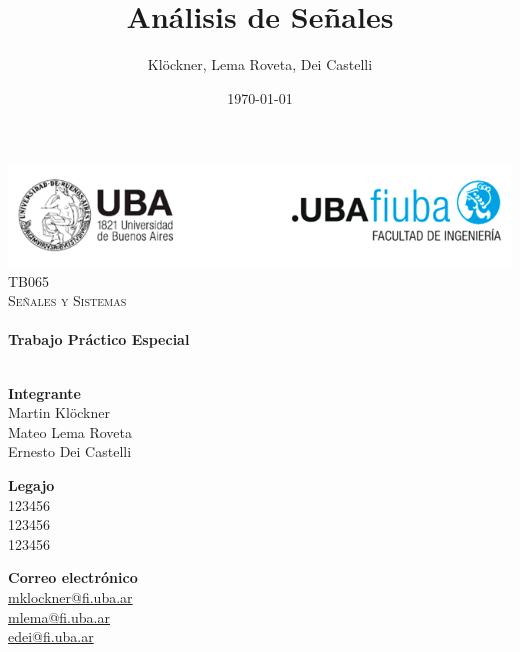 \documentclass[12pt]{article}
\title{Análisis de Señales}          %
\author{Klöckner, Lema Roveta, Dei Castelli}
\date{\today}                   %
\makeatletter
\let\thetitle\@title
\makeatother
\begin{document}
\begin{titlepage}
    \vspace*{-2.5cm}
    {\centering
    \includegraphics[width=1.00\textwidth]{logofiuba.png}\\[2.25 cm]}
    \centering
    \textsc{\Large TB065}\\[0.2 cm]
    \textsc{\large Señales y Sistemas}\\[4 cm]
    \textcolor{cyan}{{\fontsize{40}{60}\selectfont \bfseries \thetitle}}\\[0.5cm]
    {\Large \bfseries Trabajo Práctico Especial}\\[5cm]

    \vfill
    \noindent\makebox[\linewidth]{\rule{\textwidth}{0.4pt}}\\[0.5cm]
    \begin{minipage}{.50\textwidth}
    \textbf{Integrante}\\
    Martin Klöckner \\ Mateo Lema Roveta \\ Ernesto Dei Castelli
    \end{minipage}%
    \begin{minipage}{.25\textwidth}
    \textbf{Legajo}\\
    123456 \\ 
    123456 \\ 
    123456
    \end{minipage}%
    \begin{minipage}{.25\textwidth}
     \begin{flushright}
        \textbf{Correo electrónico}\\
         \href{mailto:mklockner@fi.uba.ar}{mklockner@fi.uba.ar} \\
         \href{mailto:mlema@fi.uba.ar}{mlema@fi.uba.ar} \\
         \href{mailto:edei@fi.uba.ar}{edei@fi.uba.ar}
    \end{flushright}
    \end{minipage}
\end{titlepage}

\setcounter{tocdepth}{2}
\hypersetup{linkcolor=black} %
\tableofcontents
\listoffigures
\pagebreak
\end{document}
